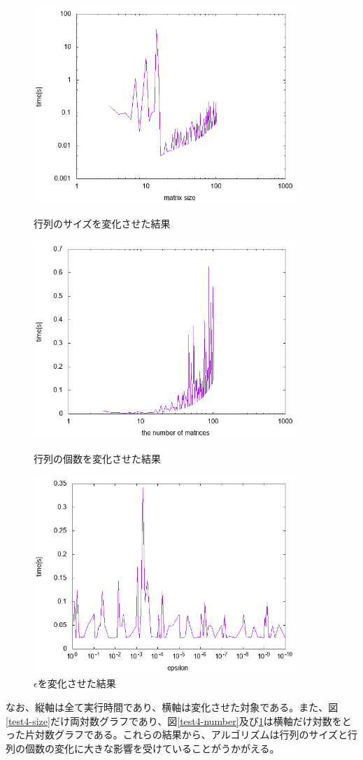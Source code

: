 \begin{figure}
  \centering
  \includegraphics[width=10cm]{weakly_feasible/size.png}
  \caption{行列のサイズを変化させた結果}
  \label{test4-size}

  \includegraphics[width=10cm]{weakly_feasible/number.png}
  \caption{行列の個数を変化させた結果}
  \label{test4-number}

  \includegraphics[width=10cm]{weakly_feasible/epsilon.png}
  \caption{$\epsilon$を変化させた結果}
  \label{test4-epsilon}
\end{figure}
なお、縦軸は全て実行時間であり、横軸は変化させた対象である。また、図\ref{test4-size}だけ両対数グラフであり、図\ref{test4-number}及び\ref{test4-epsilon}は横軸だけ対数をとった片対数グラフである。これらの結果から、アルゴリズムは行列のサイズと行列の個数の変化に大きな影響を受けていることがうかがえる。

